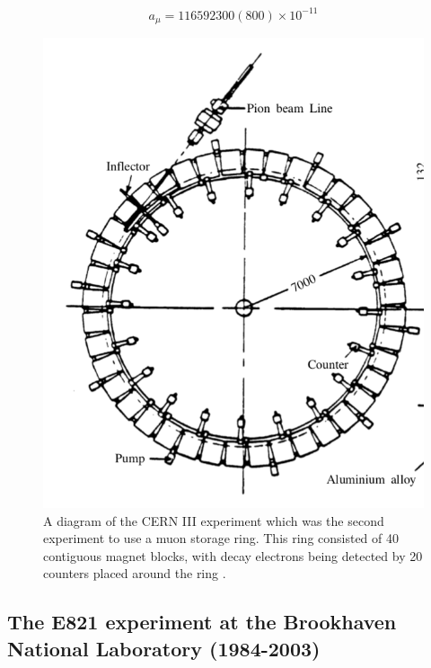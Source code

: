 \begin{equation}
a_{\mu} = 116 592 300(800){\times}10^{-11}
\end{equation}

\begin{figure}[th]
\centering
\includegraphics[scale=0.7]{Figures/cern3}
\decoRule
\caption{A diagram of the CERN III experiment which was the second experiment to use a muon storage ring. This ring consisted of 40 contiguous magnet blocks, with decay electrons being detected by 20 counters placed around the ring \cite{Reference10}.}
\label{fig:cern3}
\end{figure}

\subsection{The E821 experiment at the Brookhaven National Laboratory (1984-2003)}

